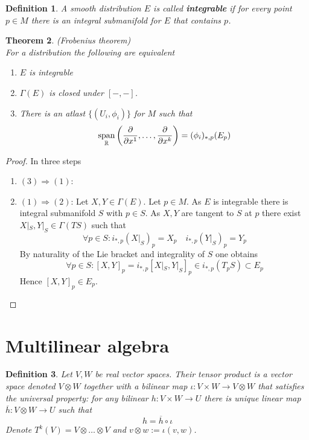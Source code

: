 \documentclass{article}
\newtheorem{theorem}{Theorem}
\numberwithin{theorem}{section}
\newtheorem{definition}[theorem]{Definition}
\newcommand{\R}{\mathbb{R}}
\newcommand{\1}{\mathds{1}}
\DeclareMathOperator{\vspan}{span}
\begin{document}
\begin{definition}
    A smooth distribution $E$ is called \textbf{integrable} if for every point $p \in M$ there is an integral submanifold for $E$ that contains $p$. 
\end{definition}

\begin{theorem}(Frobenius theorem)\\
    For a distribution the following are equivalent 
    \begin{enumerate}
        \item $E$ is integrable 
        \item $\Gamma(E)$ is closed under $[-, - ]$. 
        \item There is an atlast $\{ (U_i, \phi_i) \}$ for $M$ such that 
        \[ \vspan_{\R}\left(\pdv{}{x^1}, \dots, \pdv{}{x^k}\right) = (\phi_i)_{*, p}(E_p)\]
    \end{enumerate}
\end{theorem}
\begin{proof}
    In three steps 
    \begin{enumerate}
        \item $(3) \Rightarrow (1)$: 
        \item $(1) \Rightarrow (2)$: Let $X,Y \in \Gamma(E)$. Let $p \in M$. As $E$ is integrable there is integral submanifold $S$ with $p \in S$. As $X,Y$  are tangent to $S$ at $p$ there exist $X|_S, Y|_S \in \Gamma(TS)$ such that 
        \[ \forall p \in S : i_{*, p}(X|_S)_p = X_p \quad  i_{*, p}(Y|_S)_p = Y_p \]
        By naturality of the Lie bracket and integrality of $S$ one obtains 
        \[ \forall p \in S : [X,Y]_p = i_{*,p}[X|_S, Y|_S]_p  \in i_{*,p}(T_pS) \subset E_p \]
        Hence $[X,Y]_p \in E_p$.  
    \end{enumerate}
\end{proof}
\section{Multilinear algebra }

\begin{definition}
    Let $V,W$ be real vector spaces. Their tensor product is a vector space denoted $V \otimes W$ together with a bilinear map $\iota : V \times W \to V \otimes W $ that satisfies the universal property: for any bilinear $h: V \times W \to U$ there is unique linear map $\overline{h} : V \otimes W \to U$ such that 
    \[ h = \overline{h} \circ \iota \]
    Denote $T^k(V) = V \otimes \dots \otimes V$ and $v \otimes w := \iota(v,w)$.  
\end{definition}
\end{document}
